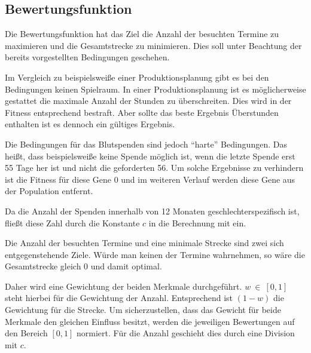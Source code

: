 \newpage
\subsection{Bewertungsfunktion}
Die Bewertungsfunktion hat das Ziel die Anzahl der besuchten Termine zu maximieren und die Gesamtstrecke zu minimieren.
Dies soll unter Beachtung der bereits vorgestellten Bedingungen geschehen.

Im Vergleich zu beispielsweiße einer Produktionsplanung gibt es bei den Bedingungen keinen Spielraum.
In einer Produktionsplanung ist es möglicherweise gestattet die maximale Anzahl der Stunden zu überschreiten.
Dies wird in der Fitness entsprechend bestraft. Aber sollte das beste Ergebnis Überstunden enthalten ist es dennoch ein gültiges Ergebnis.

Die Bedingungen für das Blutspenden sind jedoch \enquote{harte} Bedingungen.
Das heißt, dass beispielsweiße keine Spende möglich ist, wenn die letzte Spende erst 55 Tage her ist und nicht die geforderten 56.
Um solche Ergebnisse zu verhindern ist die Fitness für diese Gene $0$ und im weiteren Verlauf werden diese Gene aus der Population entfernt.

Da die Anzahl der Spenden innerhalb von 12 Monaten geschlechterspezifisch ist,
fließt diese Zahl durch die Konstante $c$ in die Berechnung mit ein.

Die Anzahl der besuchten Termine und eine minimale Strecke sind zwei sich entgegenstehende Ziele.
Würde man keinen der Termine wahrnehmen, so wäre die Gesamtstrecke gleich $0$ und damit optimal.

Daher wird eine Gewichtung der beiden Merkmale durchgeführt.\linebreak
$w~\in~[0,1]$ steht hierbei für die Gewichtung der Anzahl.
Entsprechend ist $(1-w)$ die Gewichtung für die Strecke.
Um sicherzustellen, dass das Gewicht für beide Merkmale den gleichen Einfluss besitzt,
werden die jeweiligen Bewertungen auf den Bereich $[0,1]$ normiert.
Für die Anzahl geschieht dies durch eine Division mit $c$.

